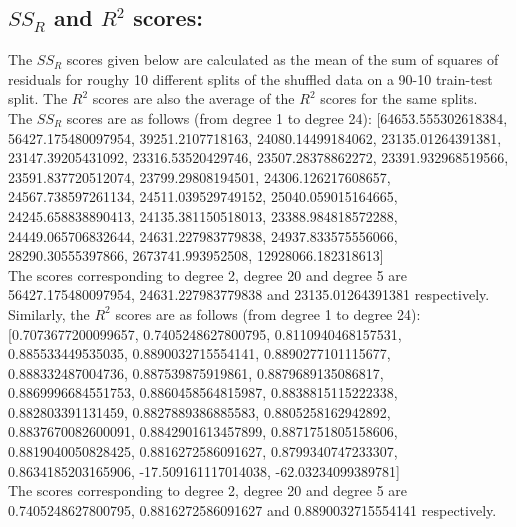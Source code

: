 \subsection{$SS_R$ and $R^2$ scores: }
The $SS_R$ scores given below are calculated as the mean of the sum of squares of residuals for roughy 10 different splits of the shuffled data on a 90-10 train-test split. The $R^2$ scores are also the average of the $R^2$ scores for the same splits.\\
The $SS_R$ scores are as follows (from degree 1 to degree 24):
[64653.555302618384, 56427.175480097954, 39251.2107718163, 24080.14499184062, 23135.01264391381, 23147.39205431092, 23316.53520429746, 23507.28378862272, 23391.932968519566, 23591.837720512074, 23799.29808194501, 24306.126217608657, 24567.738597261134, 24511.039529749152, 25040.059015164665, 24245.658838890413, 24135.381150518013, 23388.984818572288, 24449.065706832644, 24631.227983779838, 24937.833575556066, 28290.30555397866, 2673741.993952508, 12928066.182318613]\\
The scores corresponding to degree 2, degree 20 and degree 5 are 56427.175480097954, 24631.227983779838 and 23135.01264391381 respectively.\\

Similarly, the $R^2$ scores are as follows (from degree 1 to degree 24):
[0.7073677200099657, 0.7405248627800795, 0.8110940468157531, 0.885533449535035, 0.8890032715554141, 0.8890277101115677, 0.888332487004736, 0.887539875919861, 0.8879689135086817, 0.8869996684551753, 0.8860458564815987, 0.8838815115222338, 0.882803391131459, 0.8827889386885583, 0.8805258162942892, 0.8837670082600091, 0.8842901613457899, 0.8871751805158606, 0.8819040050828425, 0.8816272586091627, 0.8799340747233307, 0.8634185203165906, -17.509161117014038, -62.03234099389781]\\
The scores corresponding to degree 2, degree 20 and degree 5 are 0.7405248627800795, 0.8816272586091627 and 0.8890032715554141 respectively.\\
\newpage 